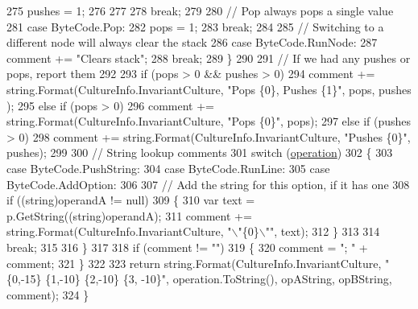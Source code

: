 \begin{DoxyCode}
275                         pushes = 1;
276 
277 
278                     \textcolor{keywordflow}{break};
279 
280                 \textcolor{comment}{// Pop always pops a single value}
281                 \textcolor{keywordflow}{case} ByteCode.Pop:
282                     pops = 1;
283                     \textcolor{keywordflow}{break};
284 
285                 \textcolor{comment}{// Switching to a different node will always clear the stack}
286                 \textcolor{keywordflow}{case} ByteCode.RunNode:
287                     comment += \textcolor{stringliteral}{"Clears stack"};
288                     \textcolor{keywordflow}{break};
289             \}
290 
291             \textcolor{comment}{// If we had any pushes or pops, report them}
292 
293             \textcolor{keywordflow}{if} (pops > 0 && pushes > 0)
294                 comment += string.Format(CultureInfo.InvariantCulture, \textcolor{stringliteral}{"Pops \{0\}, Pushes \{1\}"}, pops, pushes
      );
295             \textcolor{keywordflow}{else} \textcolor{keywordflow}{if} (pops > 0)
296                 comment += string.Format(CultureInfo.InvariantCulture, \textcolor{stringliteral}{"Pops \{0\}"}, pops);
297             \textcolor{keywordflow}{else} \textcolor{keywordflow}{if} (pushes > 0)
298                 comment += string.Format(CultureInfo.InvariantCulture, \textcolor{stringliteral}{"Pushes \{0\}"}, pushes);
299 
300             \textcolor{comment}{// String lookup comments}
301             \textcolor{keywordflow}{switch} (\hyperlink{a00115_a566bf5f7198cc353ea5c3710cb3a31cb}{operation})
302             \{
303                 \textcolor{keywordflow}{case} ByteCode.PushString:
304                 \textcolor{keywordflow}{case} ByteCode.RunLine:
305                 \textcolor{keywordflow}{case} ByteCode.AddOption:
306 
307                     \textcolor{comment}{// Add the string for this option, if it has one}
308                     \textcolor{keywordflow}{if} ((\textcolor{keywordtype}{string})operandA != null)
309                     \{
310                         var text = p.GetString((string)operandA);
311                         comment += string.Format(CultureInfo.InvariantCulture, \textcolor{stringliteral}{"\(\backslash\)"\{0\}\(\backslash\)""}, text);
312                     \}
313 
314                     \textcolor{keywordflow}{break};
315 
316             \}
317 
318             \textcolor{keywordflow}{if} (comment != \textcolor{stringliteral}{""})
319             \{
320                 comment = \textcolor{stringliteral}{"; "} + comment;
321             \}
322 
323             \textcolor{keywordflow}{return} string.Format(CultureInfo.InvariantCulture, \textcolor{stringliteral}{"\{0,-15\} \{1,-10\} \{2,-10\} \{3, -10\}"}, 
      operation.ToString(), opAString, opBString, comment);
324         \}
\end{DoxyCode}


